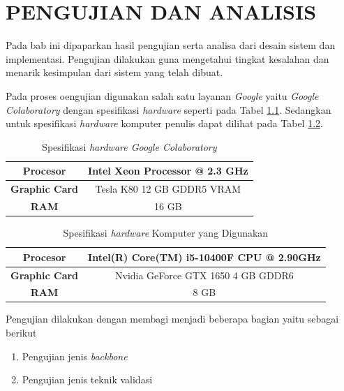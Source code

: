 \chapter{PENGUJIAN DAN ANALISIS}
\label{chap:pengujiananalisis}


Pada bab ini dipaparkan hasil pengujian serta analisa dari desain sistem dan implementasi. Pengujian dilakukan guna mengetahui tingkat kesalahan dan menarik kesimpulan dari sistem yang telah dibuat.

Pada proses oengujian digunakan salah satu layanan \textit{Google} yaitu \textit{Google Colaboratory} dengan spesifikasi \textit{hardware} seperti pada Tabel \ref{tab:spek-colab}. Sedangkan untuk spesifikasi \textit{hardware} komputer penulis dapat dilihat pada Tabel \ref{tab:spek-pc}.
\begin{table}[h!]
	\begin{center}
		\begin{tabular}{ |c|c| } 
			\hline
			\textbf{Procesor} & Intel Xeon Processor @ 2.3 GHz\\
			\hline 
			\textbf{Graphic Card} & Tesla K80 12 GB GDDR5 VRAM\\
			\hline 
			\textbf{RAM} & 16 GB\\ 
			\hline
		\end{tabular}
		\caption{Spesifikasi \textit{hardware Google Colaboratory}}
		\label{tab:spek-colab}
	\end{center}
\end{table} 

\begin{table}[h!]
	\begin{center}
		\begin{tabular}{ |c|c| } 
			\hline
			\textbf{Procesor} & Intel(R) Core(TM) i5-10400F CPU @ 2.90GHz\\
			\hline 
			\textbf{Graphic Card} & Nvidia GeForce GTX 1650 4 GB GDDR6\\
			\hline 
			\textbf{RAM} & 8 GB\\ 
			\hline
		\end{tabular}
		\caption{Spesifikasi \textit{hardware} Komputer yang Digunakan}
		\label{tab:spek-pc}
	\end{center}
\end{table}

Pengujian dilakukan dengan membagi menjadi beberapa bagian yaitu sebagai berikut

\begin{enumerate}
	\item Pengujian jenis \textit{backbone}
	\item Pengujian jenis teknik validasi
\end{enumerate}

